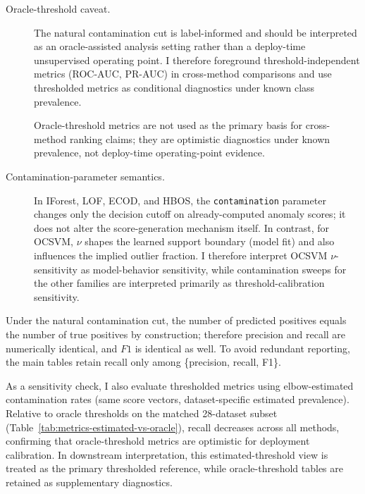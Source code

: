 \documentclass[cameraready]{Interspeech}
\begin{document}
\begin{description}
    \item[Oracle-threshold caveat.] The natural contamination cut is label-informed and should be interpreted as an oracle-assisted analysis setting rather than a deploy-time unsupervised operating point. I therefore foreground threshold-independent metrics (ROC-AUC, PR-AUC) in cross-method comparisons and use thresholded metrics as conditional diagnostics under known class prevalence.

        Oracle-threshold metrics are not used as the primary basis for cross-method ranking claims; they are optimistic diagnostics under known prevalence, not deploy-time operating-point evidence.

    \item[Contamination-parameter semantics.] In IForest, LOF, ECOD, and HBOS, the \texttt{contamination} parameter changes only the decision cutoff on already-computed anomaly scores; it does not alter the score-generation mechanism itself. In contrast, for OCSVM, \(\nu\) shapes the learned support boundary (model fit) and also influences the implied outlier fraction. I therefore interpret OCSVM \(\nu\)-sensitivity as model-behavior sensitivity, while contamination sweeps for the other families are interpreted primarily as threshold-calibration sensitivity.
\end{description}

\noindent Under the natural contamination cut, the number of predicted positives equals the number of true positives by construction; therefore precision and recall are numerically identical, and \(F1\) is identical as well. To avoid redundant reporting, the main tables retain recall only among \{precision, recall, F1\}.

As a sensitivity check, I also evaluate thresholded metrics using elbow-estimated contamination rates (same score vectors, dataset-specific estimated prevalence). Relative to oracle thresholds on the matched 28-dataset subset (Table~\ref{tab:metrics-estimated-vs-oracle}), recall decreases across all methods, confirming that oracle-threshold metrics are optimistic for deployment calibration. In downstream interpretation, this estimated-threshold view is treated as the primary thresholded reference, while oracle-threshold tables are retained as supplementary diagnostics.
\end{document}
